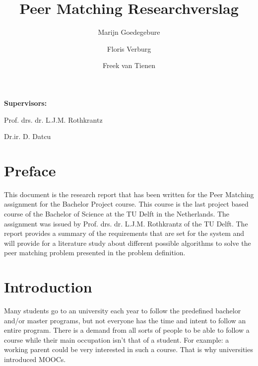\documentclass[]{article}
\title{Peer Matching Researchverslag}
\author{Marijn Goedegebure \and
	Floris Verburg \and
	Freek van Tienen}
\date{}
\begin{document}
\maketitle

\begin{center}
\end{center}

\hfill \textbf{Supervisors:}

\hfill Prof. drs. dr. L.J.M. Rothkrantz

\hfill Dr.ir. D. Datcu


\newpage

\tableofcontents

\newpage

\section{Preface}
This document is the research report that has been written for the Peer Matching assignment for the Bachelor Project course.
This course is the last project based course of the Bachelor of Science at the TU Delft in the Netherlands. The assignment was issued by Prof. drs. dr. L.J.M. Rothkrantz of the TU Delft.
The report provides a summary of the requirements that are set for the system and will provide for a literature study about different possible algorithms to solve the peer matching problem presented in the problem definition.

\section{Introduction}
Many students go to an university each year to follow the predefined bachelor and/or master programs, but not everyone has the time and intent to follow an entire program.
There is a demand from all sorts of people to be able to follow a course while their main occupation isn't that of a student.
For example: a working parent could be very interested in such a course.
That is why universities introduced MOOCs.
\end{document}

